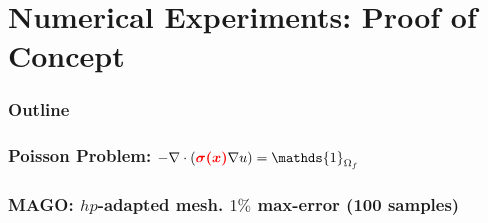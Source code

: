 \documentclass[10pt,aspectratio=149]{beamer}
\begin{document}
\section{Numerical Experiments: Proof of Concept}
\begin{frame}
    \frametitle{Outline}
    \tableofcontents[currentsection]
\end{frame}
\begin{frame}
	\frametitle{Poisson Problem: $-\nabla \cdot ( \tcr{\boldsymbol{\sigma(x)}} \nabla u) = \mathds{1}_{\Omega_{f}}$}
	\begin{figure}[t!]
	\end{figure}
\end{frame}
\begin{frame}
	\frametitle{MAGO: $hp$-adapted mesh. $1\%$ max-error (100 samples)}
\end{frame}
\end{document}
